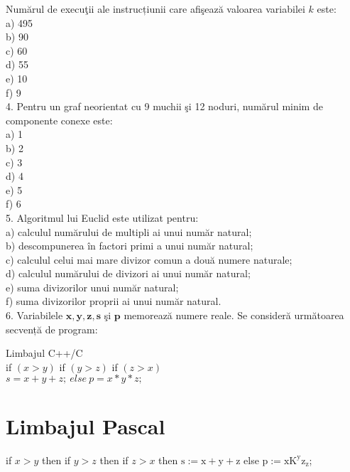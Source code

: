 Numărul de execuţii ale instrucțiunii care afişează valoarea variabilei $k$ este:\\
a) 495\\
b) 90\\
c) 60\\
d) 55\\
e) 10\\
f) 9\\
4. Pentru un graf neorientat cu 9 muchii şi 12 noduri, numărul minim de componente conexe este:\\
a) 1\\
b) 2\\
c) 3\\
d) 4\\
e) 5\\
f) 6\\
5. Algoritmul lui Euclid este utilizat pentru:\\
a) calculul numărului de multipli ai unui număr natural;\\
b) descompunerea în factori primi a unui număr natural;\\
c) calculul celui mai mare divizor comun a două numere naturale;\\
d) calculul numărului de divizori ai unui număr natural;\\
e) suma divizorilor unui număr natural;\\
f) suma divizorilor proprii ai unui număr natural.\\
6. Variabilele $\mathbf{x}, \mathbf{y}, \mathbf{z}, \mathbf{s}$ şi $\mathbf{p}$ memorează numere reale. Se consideră următoarea secvență de program:

Limbajul C++/C\\
if $(x>y)$ if $(y>z)$ if $(z>x)$\\
$s=x+y+z ; ~ e l s e ~ p=x * y * z ; ~$

\section*{Limbajul Pascal}
if $x>y$ then if $y>z$ then if $z>x$ then $\mathrm{s}:=\mathrm{x}+\mathrm{y}+\mathrm{z}$ else $\mathrm{p}:=\mathrm{x} \mathrm{K}^{\mathrm{y}} \mathrm{z}_{\mathrm{z}}$;

